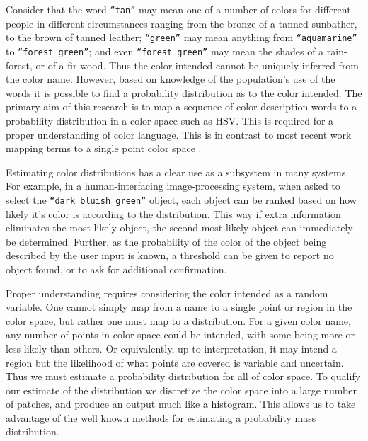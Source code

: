 \documentclass[11pt,letterpaper, twocolumn]{article}
\newcommand{\parencite}{\citep}
\begin{document}
Consider that the word \texttt{``tan''} may mean one of a number of colors for different people in different circumstances ranging from the bronze of a tanned sunbather, to the brown of tanned leather;
\texttt{``green''} may mean anything from \texttt{``aquamarine''} to \texttt{``forest green''};
 and even \texttt{``forest green''} may mean the shades of a rain-forest, or of a fir-wood.
Thus the color intended cannot be uniquely inferred from the color name.
However, based on knowledge of the population's use of the words  it is possible to find a probability distribution as to the color intended.
The primary aim of this research is to map a sequence of color description words to a probability distribution in a color space such as HSV.
This is required for a proper understanding of color language.
This is in contrast to most recent work mapping terms to a single point color space \parencite{DBLP:journals/corr/KawakamiDRS16}.


Estimating color distributions has a clear use as a subsystem in many systems.
For example, in a human-interfacing image-processing system, when asked to select the \texttt{``dark bluish green''} object, each object can be ranked based on how likely it's color is according to the distribution.
This way if extra information eliminates the most-likely object, the second most likely object can immediately be determined.
Further, as the probability of the color of the object being described by the user input is known, a threshold can be given to report no object found, or to ask for additional confirmation.


Proper understanding requires considering the color intended as a random variable.
One cannot simply map from a name to a single point or region in the color space, but rather one must map to a distribution.
For a given color name, any number of points in color space could be intended, with some being more or less likely than others.
Or equivalently, up to interpretation, it may intend a region but the likelihood of what points are covered is variable and uncertain.
Thus we must estimate a probability distribution for all of color space.
To qualify our estimate of the distribution we discretize the color space into a large number of patches, and produce an output much like a histogram.
This allows us to take advantage of the well known methods for estimating a probability mass distribution.
\end{document}
